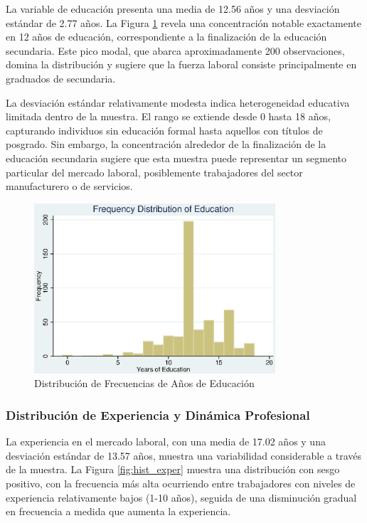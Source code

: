 \documentclass[12pt]{article}
\begin{document}
La variable de educación presenta una media de 12.56 años y una desviación estándar de 2.77 años. La Figura \ref{fig:hist_educ} revela una concentración notable exactamente en 12 años de educación, correspondiente a la finalización de la educación secundaria. Este pico modal, que abarca aproximadamente 200 observaciones, domina la distribución y sugiere que la fuerza laboral consiste principalmente en graduados de secundaria.

La desviación estándar relativamente modesta indica heterogeneidad educativa limitada dentro de la muestra. El rango se extiende desde 0 hasta 18 años, capturando individuos sin educación formal hasta aquellos con títulos de posgrado. Sin embargo, la concentración alrededor de la finalización de la educación secundaria sugiere que esta muestra puede representar un segmento particular del mercado laboral, posiblemente trabajadores del sector manufacturero o de servicios.

\begin{figure}[h!]
\centering
\includegraphics[width=0.8\textwidth]{Figures/0201-hist_educ.eps}
\caption{Distribución de Frecuencias de Años de Educación}
\label{fig:hist_educ}
\end{figure}

\subsubsection*{Distribución de Experiencia y Dinámica Profesional}

La experiencia en el mercado laboral, con una media de 17.02 años y una desviación estándar de 13.57 años, muestra una variabilidad considerable a través de la muestra. La Figura \ref{fig:hist_exper} muestra una distribución con sesgo positivo, con la frecuencia más alta ocurriendo entre trabajadores con niveles de experiencia relativamente bajos (1-10 años), seguida de una disminución gradual en frecuencia a medida que aumenta la experiencia.
\end{document}
